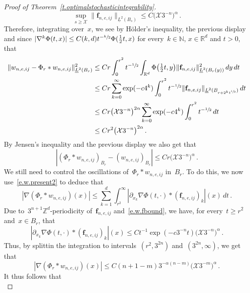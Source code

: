 \documentclass[11pt]{article} %
\numberwithin{equation}{section}
\theoremstyle{definition}
\newcommand*{\N}{\ensuremath{\mathbb{N}}}
\newcommand*{\Z}{\ensuremath{\mathbb{Z}}}
\newcommand*{\R}{\ensuremath{\mathbb{R}}}
\newcommand{\f}{\mathbf{f}}
\newcommand{\X}{\mathcal{X}}
\begin{document}
\begin{proof}[Proof of Theorem~\ref{t.optimalstochasticintegrability}]
\begin{equation}
\sup_{ s \geq \X } \| \f_{n,e,ij} \|_{\underline{L}^2(B_s) } \leq C \bigl( \X 3^{-n} \bigr)^{\alpha} \,.
\end{equation}
Therefore, integrating over~$x$, we see by H\"older's inequality, the previous display and since $|\nabla^k \Phi(t,x)| \leq C(k,d)t^{-\sfrac k2} \Phi(\frac12 t,x)$ for every~$k \in \N$, $x\in \R^d$ and $t>0$,  that 
\begin{align*}  
\| w_{n,e,ij} - \Phi_r \ast w_{n,e,ij} \|_{\underline{L}^2(B_r)}^2
& 
\leq  
C r \int_0^{r^2} t^{-\sfrac12}  \int_{\R^d} \Phi\bigl(\tfrac12 t,y\bigr) \| \f_{n,e,ij} \|_{\underline{L}^2(B_r(y))}^2 \, dy \, dt 
\\ 
&
\leq C r \sum_{k=0}^\infty \exp(-c 4^k) \int_0^{r^2} t^{-\sfrac12}  \| \f_{n,e,ij}\|_{\underline{L}^2(B_{r + 2^k t^{\sfrac12}})} \, dt
\\ 
&
\leq C r \bigl( \X 3^{-n} \bigr)^{2\alpha}  \sum_{k=0}^\infty \exp(-c 4^k) \int_0^{r^2} t^{-\sfrac12}  \, dt    
\\ 
&
\leq C r^2 \bigl( \X 3^{-n} \bigr)^{2\alpha}
\,.
\end{align*}
By Jensen's inequality and the previous display we also get that 
\begin{equation*}  
|(\Phi_r \ast w_{n,e,ij})_{B_r}  - (w_{n,e,ij})_{B_r}|  
\leq 
C r \bigl( \X 3^{-n} \bigr)^{\alpha}\,.
\end{equation*}
We still need to control the oscillations of~$\Phi_r \ast w_{n,e,ij}$ in~$B_r$. To do this, we now use~\eqref{e.w.present2} to deduce that 
\begin{equation*}  
| \nabla (\Phi_r \ast w_{n,e,ij})(x)|  \leq \sum_{k=1}^d  \int_{r^2}^\infty   | \partial_{x_k} \nabla \Phi( t ,\cdot) \ast  (\f_{n,e,ij})_k|  (x) \, dt  \,.
\end{equation*}
Due to~$3^{n+1}\Z^d$-periodicity of~$\f_{n,e,ij}$ and~\eqref{e.w.fbound}, we have, for every~$t \geq r^2$ and~$x \in B_r$, that  
\begin{equation*}  
 | \partial_{x_k} \nabla \Phi( t ,\cdot) \ast  (\f_{n,e,ij})_k|  (x) \leq C t^{-1} \exp(-c 3^{-n} t ) \bigl( \X 3^{-n} \bigr)^{\alpha}  \,.
\end{equation*}
Thus, by splittin the integration to intervals~$(r^2,3^{2n})$ and~$(3^{2n},\infty)$, we get that 
\begin{equation*}  
| \nabla (\Phi_r \ast w_{n,e,ij})(x)|  \leq  C(n +1 -m) 3^{-\alpha(n-m)} \bigl( \X 3^{-m} \bigr)^{\alpha} \,.
\end{equation*}
It thus follows that
\begin{equation*}  

\end{equation*}
\end{proof}
\end{document}
